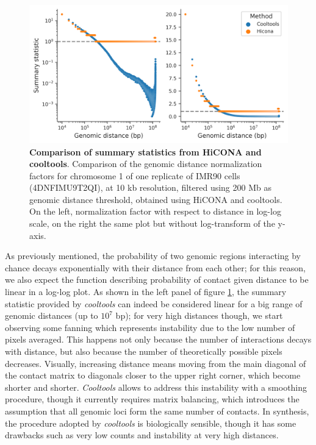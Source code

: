 \begin{figure}[ht]
  \centering
  \includegraphics[width=1\textwidth]{hicona_vs_cooltools.png}
  \caption{\textbf{Comparison of summary statistics from HiCONA and cooltools}. Comparison of the genomic distance normalization factors for chromosome 1 of one replicate of IMR90 cells (4DNFIMU9T2QI), at 10 kb resolution, filtered using 200 Mb as genomic distance threshold, obtained using HiCONA and cooltools. On the left, normalization factor with respect to distance in log-log scale, on the right the same plot but without log-transform of the y-axis.}
  \label{fig:cooltools}
\end{figure}

As previously mentioned, the probability of two genomic regions interacting by chance decays exponentially with their distance from each other; for this reason, we also expect the function describing probability of contact given distance to be linear in a log-log plot. As shown in the left panel of figure \ref{fig:cooltools}, the summary statistic provided by \textit{cooltools} can indeed be considered linear for a big range of genomic distances (up to $10^7$ bp); for very high distances though, we start observing some fanning which represents instability due to the low number of pixels averaged. This happens not only because the number of interactions decays with distance, but also because the number of theoretically possible pixels decreases. Visually, increasing distance means moving from the main diagonal of the contact matrix to diagonals closer to the upper right corner, which become shorter and shorter. \textit{Cooltools} allows to address this instability with a smoothing procedure, though it currently requires matrix balancing, which introduces the assumption that all genomic loci form the same number of contacts. In synthesis, the procedure adopted by \textit{cooltools} is biologically sensible, though it has some drawbacks such as very low counts and instability at very high distances.


